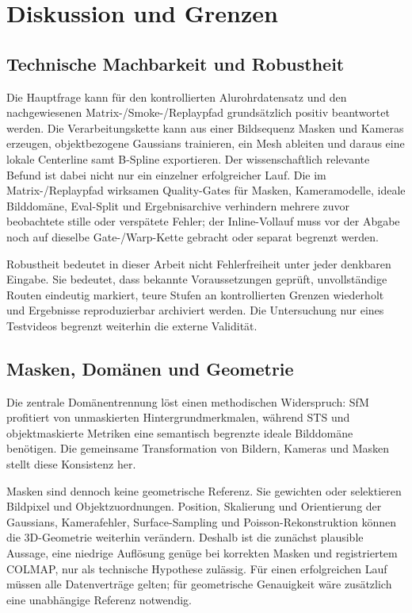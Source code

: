 \section{Diskussion und Grenzen}

\subsection{Technische Machbarkeit und Robustheit}

Die Hauptfrage kann für den kontrollierten Alurohrdatensatz und den
nachgewiesenen Matrix-/Smoke-/Replaypfad grundsätzlich positiv beantwortet
werden. Die Verarbeitungskette kann aus einer Bildsequenz Masken und Kameras
erzeugen, objektbezogene Gaussians trainieren, ein Mesh ableiten und daraus
eine lokale Centerline samt B-Spline exportieren. Der wissenschaftlich
relevante Befund ist dabei nicht nur ein einzelner erfolgreicher Lauf. Die im
Matrix-/Replaypfad wirksamen Quality-Gates für Masken, Kameramodelle, ideale
Bilddomäne, Eval-Split und Ergebnisarchive verhindern mehrere zuvor
beobachtete stille oder verspätete Fehler; der Inline-Vollauf muss vor der
Abgabe noch auf dieselbe Gate-/Warp-Kette gebracht oder separat begrenzt werden.

Robustheit bedeutet in dieser Arbeit nicht Fehlerfreiheit unter jeder
denkbaren Eingabe. Sie bedeutet, dass bekannte Voraussetzungen geprüft,
unvollständige Routen eindeutig markiert, teure Stufen an kontrollierten
Grenzen wiederholt und Ergebnisse reproduzierbar archiviert werden. Die
Untersuchung nur eines Testvideos begrenzt weiterhin die externe Validität.

\subsection{Masken, Domänen und Geometrie}

Die zentrale Domänentrennung löst einen methodischen Widerspruch: SfM profitiert
von unmaskierten Hintergrundmerkmalen, während STS und objektmaskierte
Metriken eine semantisch begrenzte ideale Bilddomäne benötigen. Die gemeinsame
Transformation von Bildern, Kameras und Masken stellt diese Konsistenz her.

Masken sind dennoch keine geometrische Referenz. Sie gewichten oder selektieren
Bildpixel und Objektzuordnungen. Position, Skalierung und Orientierung der
Gaussians, Kamerafehler, Surface-Sampling und Poisson-Rekonstruktion können die
3D-Geometrie weiterhin verändern. Deshalb ist die zunächst plausible Aussage,
eine niedrige Auflösung genüge bei korrekten Masken und registriertem COLMAP,
nur als technische Hypothese zulässig. Für einen erfolgreichen Lauf müssen alle
Datenverträge gelten; für geometrische Genauigkeit wäre zusätzlich eine
unabhängige Referenz notwendig.

